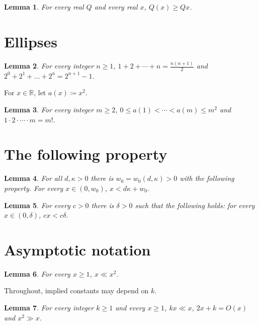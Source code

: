 \documentclass{article}
\newtheorem{lemma}{Lemma}
\begin{document}
\begin{lemma}\label{product-or-name}
For every real $Q$ and every real $x$, $Q(x)\ge Qx$.
\end{lemma}

\section{Ellipses}

\begin{lemma}\label{ellipsis-sum}
For every integer $n\ge1$, $1+2+\cdots+n=\frac{n(n+1)}2$ and $2^0+2^1+\dots+2^n=2^{n+1}-1$.
\end{lemma}

For $x\in\mathbb R$, let $a(x)\coloneqq x^2$.

\begin{lemma}\label{ellipsis-chain}
For every integer $m\ge2$, $0\le a(1)<\cdots<a(m)\le m^2$ and $1\cdot2\cdot\cdots\cdot m=m!$.
\end{lemma}

\section{The following property}

\begin{lemma}\label{following-property}
For all $d,\kappa>0$ there is $w_0=w_0(d,\kappa)>0$ with the following property.
For every $x\in(0,w_0)$, $x<d\kappa+w_0$.
\end{lemma}

\begin{lemma}\label{following-holds}
For every $c>0$ there is $\delta>0$ such that the following holds: for every $x\in(0,\delta)$, $cx<c\delta$.
\end{lemma}

\section{Asymptotic notation}

\begin{lemma}\label{no-convention}
For every $x\ge1$, $x\ll x^2$.
\end{lemma}

Throughout, implied constants may depend on $k$.

\begin{lemma}\label{implied}
For every integer $k\ge1$ and every $x\ge1$, $kx\ll x$, $2x+k=O(x)$ and $x^2\gg x$.
\end{lemma}
\end{document}
